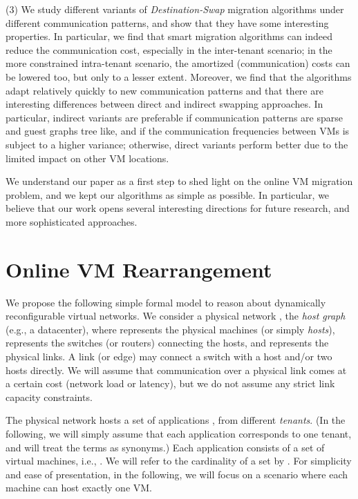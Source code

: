 \documentclass[conference]{IEEEtran}
\begin{document}
\noindent (3) We study different variants of \emph{Destination-Swap} migration algorithms under different communication patterns, and
show that they have some interesting properties. In particular, we find that
smart migration algorithms can indeed reduce the communication cost, especially in the inter-tenant
scenario; in the more constrained intra-tenant scenario, the amortized (communication) costs
can be lowered too, but only to a lesser extent. Moreover, we find that the algorithms adapt
relatively quickly to new communication patterns and that there are interesting
differences between direct and indirect swapping approaches. In particular, indirect variants are preferable
if communication patterns are sparse and guest graphs tree like, and if the communication
frequencies between VMs is subject to a higher variance; otherwise, direct variants perform better
due to the limited impact on other VM locations.

We understand our paper as a first step to shed light on the online VM migration problem,
and we kept our algorithms as simple as possible. In particular, we believe that our work
opens several interesting directions for future research, and more sophisticated approaches.



\section{Online VM Rearrangement}\label{sec:model}

We propose the following simple formal model to reason about dynamically reconfigurable virtual networks.
We consider a physical network , the \emph{host graph} (e.g., a datacenter), where  represents the physical machines (or simply \emph{hosts}),
 represents the switches (or routers) connecting the hosts, and  represents the physical links. A link (or edge) may connect a switch with a host and/or two hosts directly. We will assume that communication over a physical link comes at a certain cost (network load or latency), but we do not assume any strict link capacity constraints.

The physical network hosts a set of applications , from  different \emph{tenants}. (In the following, we will
simply assume that each application corresponds to one tenant, and will treat the terms as synonyms.) Each application 
consists of a set of virtual machines, i.e., . We will refer to the cardinality of a set  by .
For simplicity and ease of presentation,
in the following, we will focus on a scenario where each machine  can host exactly
one VM.
\end{document}
